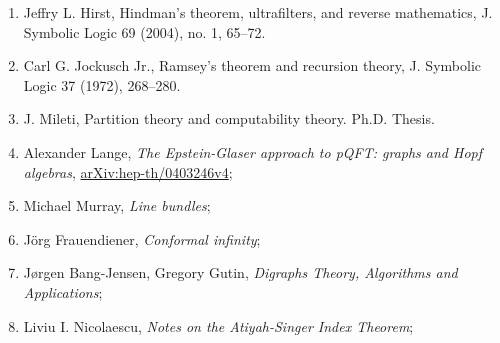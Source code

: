 \documentclass[a4paper,11pt]{article}
\begin{document}
\begin{enumerate}
\item Jeffry L. Hirst, Hindman’s theorem, ultrafilters, and reverse
  mathematics, J. Symbolic Logic 69 (2004), no. 1, 65–72.



\item Carl G. Jockusch Jr., Ramsey’s theorem and recursion theory, J.
  Symbolic Logic 37 (1972), 268–280.



\item J. Mileti, Partition theory and computability theory. Ph.D.
  Thesis.



\item Alexander Lange, \textit{The Epstein-Glaser approach to pQFT:
    graphs and Hopf algebras},
  \href{https://arxiv.org/abs/hep-th/0403246v4}{arXiv:hep-th/0403246v4};



\item Michael Murray, \textit{Line bundles};



\item J\"{o}rg Frauendiener, \textit{Conformal infinity};



\item J\o rgen Bang-Jensen, Gregory Gutin, \textit{Digraphs Theory,
    Algorithms and Applications};



\item Liviu I. Nicolaescu, \textit{Notes on the Atiyah-Singer Index
    Theorem};




\end{enumerate}
\end{document}

